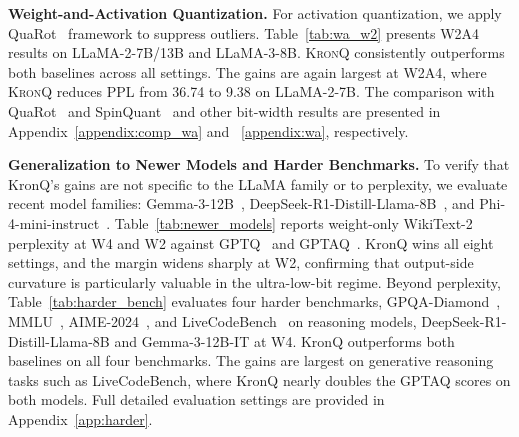 \documentclass{article} %
\newcommand{\KronQ}{\textsc{KronQ}}
\begin{document}
\noindent \textbf{Weight-and-Activation Quantization.}
For activation quantization, we apply QuaRot~\citep{ashkboos2024quarot} framework to suppress outliers. Table~\ref{tab:wa_w2} presents W2A4 results on LLaMA-2-7B/13B and LLaMA-3-8B. \KronQ{} consistently outperforms both baselines across all settings. The gains are again largest at W2A4, where \KronQ{} reduces PPL from 36.74 to 9.38 on LLaMA-2-7B. The comparison with QuaRot~\citep{ashkboos2024quarot} and SpinQuant~\citep{liu2024spinquant} and other bit-width results are presented in Appendix~\ref{appendix:comp_wa} and ~\ref{appendix:wa}, respectively.

\textbf{Generalization to Newer Models and Harder Benchmarks.} To verify that KronQ's gains are not specific to the LLaMA family or to perplexity, we evaluate recent model families: Gemma-3-12B~\citep{gemma3}, DeepSeek-R1-Distill-Llama-8B~\citep{guo2025deepseek}, and Phi-4-mini-instruct~\citep{abouelenin2025phi}. Table~\ref{tab:newer_models} reports weight-only WikiText-2 perplexity at W4 and W2 against GPTQ~\citep{frantar2022gptq} and GPTAQ~\citep{li2025gptaq}. KronQ wins all eight settings, and the margin widens sharply at W2, confirming that output-side curvature is particularly valuable in the ultra-low-bit regime. Beyond perplexity, Table~\ref{tab:harder_bench} evaluates four harder benchmarks, GPQA-Diamond~\citep{rein2023gpqa}, MMLU~\citep{hendrycks2020measuring}, AIME-2024~\citep{maxwelljia2024aime}, and LiveCodeBench~\citep{jain2025livecodebench} on reasoning models, DeepSeek-R1-Distill-Llama-8B and Gemma-3-12B-IT at W4. KronQ outperforms both baselines on all four benchmarks. The gains are largest on generative reasoning tasks such as LiveCodeBench, where KronQ nearly doubles the GPTAQ scores on both models. Full detailed evaluation settings are provided in Appendix~\ref{app:harder}.
\end{document}
